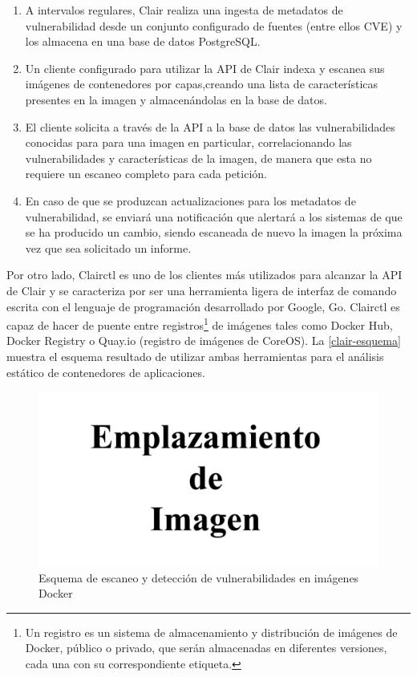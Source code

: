 \begin{enumerate}
	\item A intervalos regulares, Clair realiza una ingesta de metadatos de vulnerabilidad desde un conjunto configurado de fuentes (entre ellos \gls{CVE}) y los almacena en una base de datos PostgreSQL.
	\item Un cliente configurado para utilizar la \gls{API} de Clair indexa y escanea sus imágenes de contenedores por capas,creando una lista de características presentes en la imagen y almacenándolas en la base de datos.
	\item El cliente solicita a través de la \gls{API} a la base de datos las vulnerabilidades conocidas para para una imagen en particular, correlacionando las vulnerabilidades y características de la imagen, de manera que esta no requiere un escaneo completo para cada petición.
	\item En caso de que se produzcan actualizaciones para los metadatos de vulnerabilidad, se enviará una notificación que alertará a los sistemas de que se ha producido un cambio, siendo escaneada de nuevo la imagen la próxima vez que sea solicitado un informe.
\end{enumerate}

Por otro lado, Clairctl es uno de los clientes más utilizados para alcanzar la \gls{API} de Clair y se caracteriza por ser una herramienta ligera de interfaz de comando escrita con el lenguaje de programación desarrollado por Google, Go. Clairctl es capaz de hacer de puente entre registros\footnote{Un registro es un sistema de almacenamiento y distribución de imágenes de Docker, público o privado, que serán almacenadas en diferentes versiones, cada una con su correspondiente etiqueta.} de imágenes tales como Docker Hub, Docker Registry o Quay.io (registro de imágenes de CoreOS). La \autoref{clair-esquema} muestra el esquema resultado de utilizar ambas herramientas para el análisis estático de contenedores de aplicaciones.

\begin{figure}[htbp]
	\centering
	\includegraphics[width=0.80\linewidth]
	{figuras/emplazamiento-imagen.png}
	\caption{Esquema de escaneo y detección de vulnerabilidades en imágenes Docker}
	\label{clair-esquema}
\end{figure}


